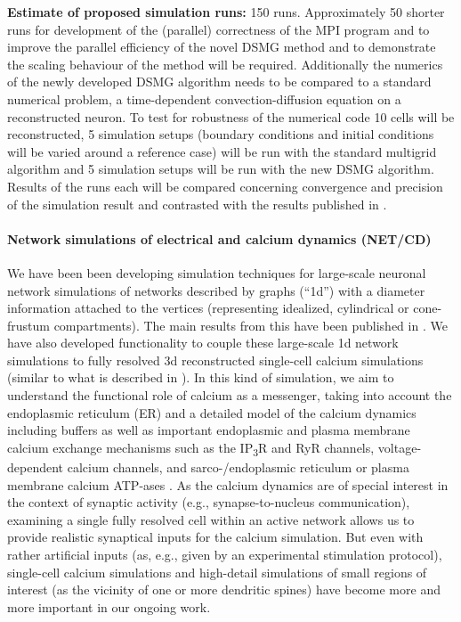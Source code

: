 \noindent \textbf{Estimate of proposed simulation runs:} 150 runs.
Approximately 50 shorter runs for development of the (parallel) correctness of the MPI program and to improve the parallel efficiency 
of the novel DSMG method and to demonstrate the scaling behaviour of the method will be required. 
Additionally the numerics of the newly developed DSMG algorithm needs to be compared to a standard
numerical problem, a time-dependent convection-diffusion equation on a reconstructed
neuron. To test for robustness of the numerical code 10 cells will be reconstructed,
5 simulation setups (boundary conditions and initial conditions will be varied around a reference case) 
will be run with the standard multigrid algorithm and 5 simulation setups will be run with the new
DSMG algorithm. Results of the runs each will be compared concerning convergence and precision
of the simulation result and contrasted with the results published in \cite{Breit2018}.

\paragraph{Network simulations of electrical and calcium dynamics (NET/CD)}
We have been been developing simulation techniques
for large-scale neuronal network simulations of networks described by graphs  (``1d'') with a
diameter information attached to the vertices (representing idealized, cylindrical or
cone-frustum compartments). The main results from this have been published in \cite{Breit2016}.
We have also developed functionality to couple these large-scale 1d network simulations to fully
resolved 3d reconstructed single-cell calcium simulations (similar to what is described in
\cite{Grein14}). In this kind of simulation, we aim to understand the functional role of calcium
as a messenger, taking into account the endoplasmic reticulum (ER) and a detailed model of the
calcium dynamics including buffers as well as important endoplasmic and plasma membrane calcium
exchange mechanisms such as the IP\textsubscript{3}R and RyR channels, voltage-dependent calcium
channels, and sarco-/endoplasmic reticulum or plasma membrane calcium ATP-ases \cite{Breit13, Breit2018a, Breit2018b}.
As the calcium dynamics are of special interest in the context of synaptic activity (e.g.,
synapse-to-nucleus communication), examining a single fully resolved cell within an active
network allows us to provide realistic synaptical inputs for the calcium simulation.
But even with rather artificial inputs (as, e.g., given by an experimental stimulation protocol),
single-cell calcium simulations and high-detail simulations of small regions of interest (as the
vicinity of one or more dendritic spines) have become more and more important in our ongoing work.

